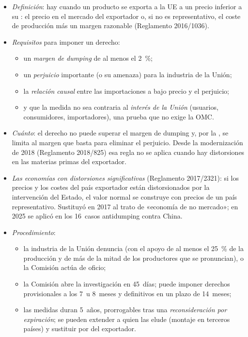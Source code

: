 \documentclass[11pt]{article}
\begin{document}
\begin{itemize}
\item \emph{Definición}: hay  cuando un producto se exporta a la UE a un precio inferior a su : el precio en el mercado del exportador o, si no es representativo, el coste de producción más un margen razonable (Reglamento 2016/1036)\nocite{UE2016Antidumping}.
\item \emph{Requisitos} para imponer un derecho:
  \begin{itemize}
  \item un \emph{margen de dumping} de al menos el 2~\%;
  \item un \emph{perjuicio} importante (o su amenaza) para la industria de la Unión;
  \item la \emph{relación causal} entre las importaciones a bajo precio y el perjuicio;
  \item y que la medida no sea contraria al \emph{interés de la Unión} (usuarios, consumidores, importadores), una prueba que no exige la OMC.
  \end{itemize}
\item \emph{Cuánto}: el derecho no puede superar el margen de dumping y, por la , se limita al margen que basta para eliminar el perjuicio. Desde la modernización de 2018 (Reglamento 2018/825) esa regla no se aplica cuando hay distorsiones en las materias primas del exportador.
\item \emph{Las economías con distorsiones significativas} (Reglamento 2017/2321): si los precios y los costes del país exportador están distorsionados por la intervención del Estado, el valor normal se construye con precios de un país representativo. Sustituyó en 2017 al trato de «economía de no mercado»; en 2025 se aplicó en los 16~casos antidumping contra China\nocite{CE2026DefensaComercial}.
\item \emph{Procedimiento}:
  \begin{itemize}
  \item la industria de la Unión denuncia (con el apoyo de al menos el 25~\% de la producción y de más de la mitad de los productores que se pronuncian), o la Comisión actúa de oficio;
  \item la Comisión abre la investigación en 45~días; puede imponer derechos provisionales a los 7~u 8~meses y definitivos en un plazo de 14~meses;
  \item las medidas duran 5~años, prorrogables tras una \emph{reconsideración por expiración}; se pueden extender a quien las elude (montaje en terceros países) y sustituir por  del exportador.
  \end{itemize}
\end{itemize}
\end{document}
